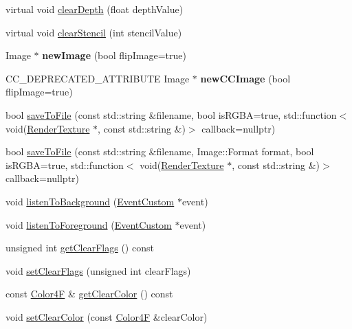 \begin{DoxyCompactItemize}
virtual void \hyperlink{classRenderTexture_a962a6c857ca07ac223bb1ec175633377}{clear\+Depth} (float depth\+Value)
\item 
virtual void \hyperlink{classRenderTexture_a8b0c62632ff8f1ae8ab082f1061379d2}{clear\+Stencil} (int stencil\+Value)
\item 
\mbox{\label{classRenderTexture_a16b19a8a8ec31e85ec06da8238d6683a}} 
Image $\ast$ {\bfseries new\+Image} (bool flip\+Image=true)
\item 
\mbox{\label{classRenderTexture_a64a8ddc3d0c22487b290082e846243ac}} 
C\+C\+\_\+\+D\+E\+P\+R\+E\+C\+A\+T\+E\+D\+\_\+\+A\+T\+T\+R\+I\+B\+U\+TE Image $\ast$ {\bfseries new\+C\+C\+Image} (bool flip\+Image=true)
\item 
bool \hyperlink{classRenderTexture_af825fb3cddf5bae91ee9e89d31c2b5d7}{save\+To\+File} (const std\+::string \&filename, bool is\+R\+G\+BA=true, std\+::function$<$ void(\hyperlink{classRenderTexture}{Render\+Texture} $\ast$, const std\+::string \&)$>$ callback=nullptr)
\item 
bool \hyperlink{classRenderTexture_a125c91da47e019bd3c2c55a8f3070d8a}{save\+To\+File} (const std\+::string \&filename, Image\+::\+Format format, bool is\+R\+G\+BA=true, std\+::function$<$ void(\hyperlink{classRenderTexture}{Render\+Texture} $\ast$, const std\+::string \&)$>$ callback=nullptr)
\item 
void \hyperlink{classRenderTexture_a1ee79c4fa86ceae2511cd6ba4784f563}{listen\+To\+Background} (\hyperlink{classEventCustom}{Event\+Custom} $\ast$event)
\item 
void \hyperlink{classRenderTexture_adb9d5534da000cff4d4402f5049dfa11}{listen\+To\+Foreground} (\hyperlink{classEventCustom}{Event\+Custom} $\ast$event)
\item 
unsigned int \hyperlink{classRenderTexture_ab20bf288dc1db1f0a21b0a0689a8e2aa}{get\+Clear\+Flags} () const
\item 
void \hyperlink{classRenderTexture_aa7614dfcc66334421283da912887eb42}{set\+Clear\+Flags} (unsigned int clear\+Flags)
\item 
const \hyperlink{structColor4F}{Color4F} \& \hyperlink{classRenderTexture_a817a532e942a9eb456a2bb354eae2b42}{get\+Clear\+Color} () const
\item 
void \hyperlink{classRenderTexture_af4a8bbb32af1b96a23a28389b7c564d6}{set\+Clear\+Color} (const \hyperlink{structColor4F}{Color4F} \&clear\+Color)
\item 

\end{DoxyCompactItemize}
